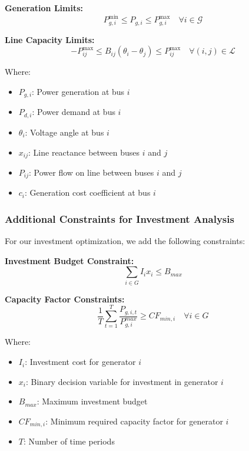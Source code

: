 \textbf{Generation Limits:}
\begin{equation}
    P_{g,i}^{\min} \leq P_{g,i} \leq P_{g,i}^{\max} \quad \forall i \in \mathcal{G} \label{eq:gen_limits}
\end{equation}

\textbf{Line Capacity Limits:}
\begin{equation}
    -P_{ij}^{\max} \leq B_{ij}(\theta_i - \theta_j) \leq P_{ij}^{\max} \quad \forall (i,j) \in \mathcal{L} \label{eq:flow_limits}
\end{equation}

Where:
\begin{itemize}
    \item $P_{g,i}$: Power generation at bus $i$
    \item $P_{d,i}$: Power demand at bus $i$
    \item $\theta_i$: Voltage angle at bus $i$
    \item $x_{ij}$: Line reactance between buses $i$ and $j$
    \item $P_{ij}$: Power flow on line between buses $i$ and $j$
    \item $c_i$: Generation cost coefficient at bus $i$
\end{itemize}

\subsubsection{Additional Constraints for Investment Analysis}
For our investment optimization, we add the following constraints:

\textbf{Investment Budget Constraint:}
\begin{equation}
    \sum_{i \in G} I_i x_i \leq B_{max}
\end{equation}

\textbf{Capacity Factor Constraints:}
\begin{equation}
    \frac{1}{T} \sum_{t=1}^T \frac{P_{g,i,t}}{P_{g,i}^{max}} \geq CF_{min,i} \quad \forall i \in G
\end{equation}

Where:
\begin{itemize}
    \item $I_i$: Investment cost for generator $i$
    \item $x_i$: Binary decision variable for investment in generator $i$
    \item $B_{max}$: Maximum investment budget
    \item $CF_{min,i}$: Minimum required capacity factor for generator $i$
    \item $T$: Number of time periods
\end{itemize}

